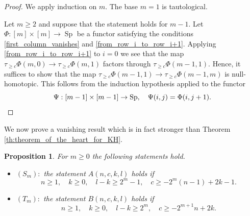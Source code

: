\documentclass[11pt,leqno]{amsart}
\newtheorem{prop}[theo]{Proposition}
\numberwithin{equation}{section}
\newcommand{\Sp}{\operatorname{Sp}}
\begin{document}
\begin{proof}
We apply induction on $m.$ The base $m=1$ is tautological.

Let $m\geq 2$ and suppose that the statement holds for $m-1.$ Let $\Phi:[m]\times [m]\to \Sp$ be a functor satisfying the conditions \ref{first_column_vanishes} and \ref{from_row_i_to_row_i+1}. Applying \ref{from_row_i_to_row_i+1} to $i=0$ we see that the map $\tau_{\geq c}\Phi(m,0)\to \tau_{\geq c}\Phi(m,1)$ factors through $\tau_{\geq c}\Phi(m-1,1).$ Hence, it suffices to show that the map $\tau_{\geq c}\Phi(m-1,1)\to \tau_{\geq c}\Phi(m-1,m)$ is null-homotopic. This follows from the induction hypothesis applied to the functor
\begin{equation*}
\Psi:[m-1]\times [m-1]\to\Sp,\quad \Psi(i,j)=\Phi(i,j+1).\qedhere
\end{equation*}
\end{proof}

We now prove a vanishing result which is in fact stronger than Theorem \ref{th:theorem_of_the_heart_for_KH}.

\begin{prop}\label{prop:statements_S_m_and_T_m}
For $m\geq 0$ the following statements hold.
\begin{itemize}
	\item $(S_m):$ the statement $A(n,c,k,l)$ holds if 
	\begin{equation*}
	n\geq 1,\quad k\geq 0,\quad l-k\geq 2^m -1,\quad c\geq -2^m(n-1)+2k-1.
	\end{equation*}
	\item $(T_m):$ the statement $B(n,c,k,l)$ holds if
	\begin{equation*}
		n\geq 1,\quad k\geq 0,\quad l-k\geq 2^m,\quad c\geq -2^{m+1} n+2k.
	\end{equation*}
\end{itemize}
\end{prop}
\end{document}
